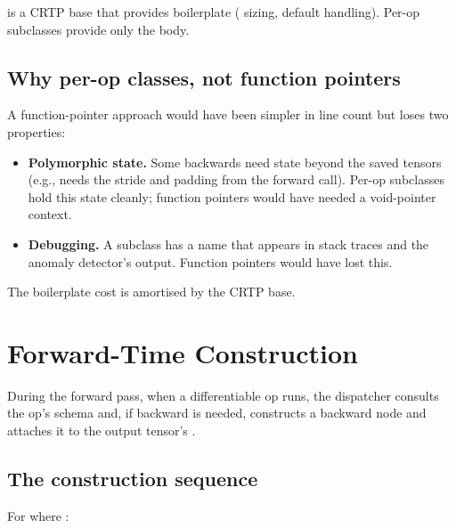  is a CRTP base that
provides boilerplate ( sizing, default
 handling). Per-op subclasses provide only
the  body.

\subsection{Why per-op classes, not function pointers}
\label{ssec:autograd_engine:why_classes}

A function-pointer approach would have been simpler in line
count but loses two properties:

\begin{itemize}
  \item \textbf{Polymorphic state.} Some backwards need state
    beyond the saved tensors (e.g.,  needs the
    stride and padding from the forward call). Per-op subclasses
    hold this state cleanly; function pointers would have needed
    a void-pointer context.
  \item \textbf{Debugging.} A  subclass has a name that
    appears in stack traces and the anomaly detector's output.
    Function pointers would have lost this.
\end{itemize}

The boilerplate cost is amortised by the CRTP base.

\section{Forward-Time Construction}
\label{sec:autograd_engine:construction}

During the forward pass, when a differentiable op runs, the
dispatcher consults the op's schema and, if backward is needed,
constructs a backward node and attaches it to the output tensor's
.

\subsection{The construction sequence}
\label{ssec:autograd_engine:construction_seq}

For  where :


